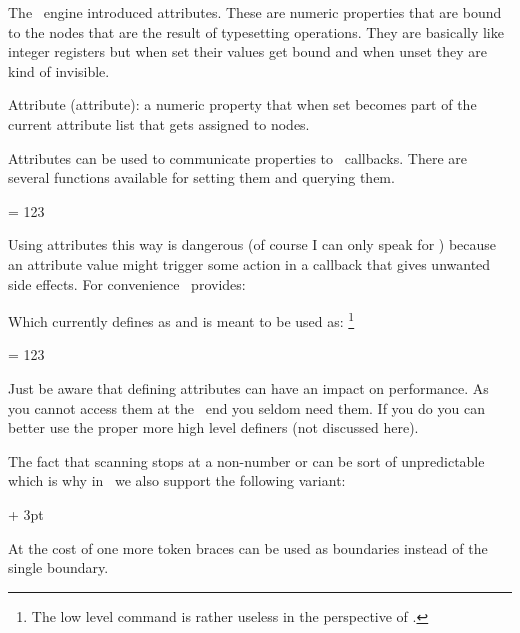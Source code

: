 \stopsectionlevel

\startsectionlevel[title={\LUATEX\ primitives}]

The \LUATEX\ engine introduced attributes. These are numeric properties that are
bound to the nodes that are the result of typesetting operations. They are
basically like integer registers but when set their values get bound and when
unset they are kind of invisible.

\startitemize
\startitem
    Attribute (attribute): a numeric property that when set becomes part of the
    current attribute list that gets assigned to nodes.
\stopitem
\stopitemize

Attributes can be used to communicate properties to \LUA\ callbacks. There are
several functions available for setting them and querying them.

\starttyping[option=TEX]
 = 123
\stoptyping

Using attributes this way is dangerous (of course I can only speak for \CONTEXT)
because an attribute value might trigger some action in a callback that gives
unwanted side effects. For convenience \CONTEXT\ provides:

\startbuffer
\newattribute\MyAttribute
\stopbuffer

\typebuffer[option=TEX] \getbuffer

Which currently defines \type {\MyAttribute} as {\tt \meaning\MyAttribute} and is
meant to be used as: \footnote {The low level \type {\attributedef} command is
rather useless in the perspective of \CONTEXT.}

\starttyping[option=TEX]
\attribute\MyAttribute = 123
\stoptyping

Just be aware that defining attributes can have an impact on performance. As you
cannot access them at the \TEX\ end you seldom need them. If you do you can
better use the proper more high level definers (not discussed here).

\stopsectionlevel

\startsectionlevel[title={\LUAMETATEX\ primitives}]

The fact that scanning stops at a non-number or \type {\relax} can be sort of
unpredictable which is why in \LUAMETATEX\ we also support the following variant:

\starttyping[option=TEX]
\scratchdimen\dimexpr  10pt + 3pt \relax
\scratchdimen\dimexpr {10pt + 3pt}
\stoptyping

At the cost of one more token braces can be used as boundaries instead of the
single \type {\relax} boundary.

